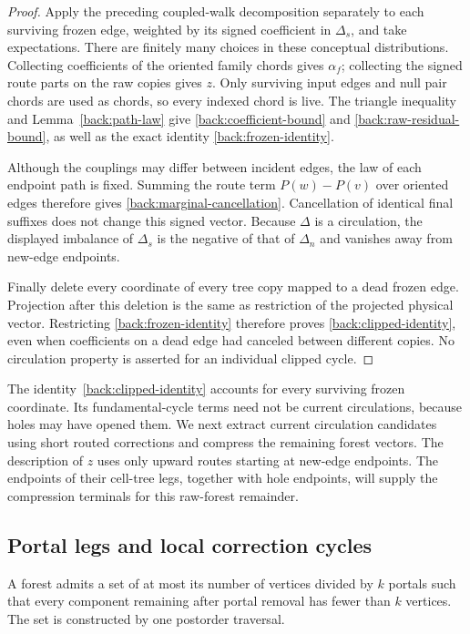 \begin{proof}
Apply the preceding coupled-walk decomposition separately to each
surviving frozen edge, weighted by its signed coefficient in
$\Delta_s$, and take expectations.  There are finitely many choices
in these conceptual distributions.  Collecting coefficients of the
oriented family chords gives $\alpha_f$; collecting the signed route
parts on the raw copies gives $z$.  Only surviving input edges and
null pair chords are used as chords, so every indexed chord is live.
The triangle inequality and Lemma~\ref{back:path-law} give
\eqref{back:coefficient-bound} and \eqref{back:raw-residual-bound},
as well as the exact identity \eqref{back:frozen-identity}.

Although the couplings may differ between incident edges, the law of
each endpoint path is fixed.  Summing the route term
$P(w)-P(v)$ over oriented edges therefore gives
\eqref{back:marginal-cancellation}.  Cancellation of identical final
suffixes does not change this signed vector.  Because $\Delta$ is a
circulation, the displayed imbalance of $\Delta_s$ is the negative
of that of $\Delta_n$ and vanishes away from new-edge endpoints.

Finally delete every coordinate of every tree copy mapped to a dead
frozen edge.  Projection after this deletion is the same as restriction
of the projected physical vector.  Restricting
\eqref{back:frozen-identity} therefore proves
\eqref{back:clipped-identity}, even when coefficients on a dead edge
had canceled between different copies.  No circulation property is
asserted for an individual clipped cycle.
\end{proof}

The identity~\eqref{back:clipped-identity} accounts for every surviving
frozen coordinate.  Its fundamental-cycle terms need not be current
circulations, because holes may have opened them.
We next extract current circulation candidates using short
routed corrections and compress the remaining forest vectors.
The description of $z$ uses only upward routes starting at new-edge
endpoints.  The endpoints of their cell-tree legs, together with hole
endpoints, will supply the compression terminals for this raw-forest
remainder.

\subsection{Portal legs and local correction cycles}

\begin{lemma}
\label{back:portals}
A forest admits a set of at most its number of vertices divided by $k$
portals such that every component remaining after portal removal has
fewer than $k$ vertices.  The set is constructed by one postorder
traversal.
\end{lemma}

